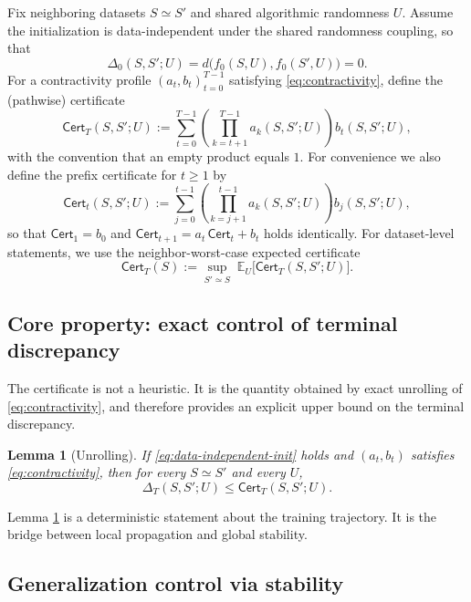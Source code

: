 \documentclass{article}
\newtheorem{lemma}[theorem]{Lemma}
\numberwithin{equation}{section}
\begin{document}
Fix neighboring datasets $S\simeq S'$ and shared algorithmic randomness $U$.
Assume the initialization is data-independent under the shared randomness coupling, so that
\begin{equation}
	\label{eq:data-independent-init}
	\Delta_0(S,S';U)=d\!\big(f_0(S,U),f_0(S',U)\big)=0.
\end{equation}
For a contractivity profile $(a_t,b_t)_{t=0}^{T-1}$ satisfying \eqref{eq:contractivity}, define the (pathwise) certificate
\begin{equation}
	\label{eq:certificate-pathwise}
	\mathsf{Cert}_T(S,S';U)
	:=
	\sum_{t=0}^{T-1}
	\left(\prod_{k=t+1}^{T-1} a_k(S,S';U)\right)
	b_t(S,S';U),
\end{equation}
with the convention that an empty product equals $1$. For convenience we also define the prefix certificate for $t\ge 1$ by
\[
\mathsf{Cert}_t(S,S';U)
:=
\sum_{j=0}^{t-1}
\left(\prod_{k=j+1}^{t-1} a_k(S,S';U)\right)b_j(S,S';U),
\]
so that $\mathsf{Cert}_1=b_0$ and $\mathsf{Cert}_{t+1}=a_t\,\mathsf{Cert}_t+b_t$ holds identically. For dataset-level statements, we use the neighbor-worst-case expected certificate
\begin{equation}
	\label{eq:certificate-dataset}
	\mathsf{Cert}_T(S)
	:=
	\sup_{S'\simeq S}\;
	\mathbb{E}_U\big[\mathsf{Cert}_T(S,S';U)\big].
\end{equation}

\subsection{Core property: exact control of terminal discrepancy}
\label{subsec:certificate-discrepancy}

The certificate is not a heuristic. It is the quantity obtained by exact unrolling of \eqref{eq:contractivity}, and therefore provides an explicit upper bound on the terminal discrepancy.

\begin{lemma}[Unrolling]
	\label{lem:unrolling}
	If \eqref{eq:data-independent-init} holds and $(a_t,b_t)$ satisfies \eqref{eq:contractivity}, then for every $S\simeq S'$ and every $U$,
	\[
	\Delta_T(S,S';U)\le \mathsf{Cert}_T(S,S';U).
	\]
\end{lemma}

\noindent
Lemma \ref{lem:unrolling} is a deterministic statement about the training trajectory. It is the bridge between local propagation and global stability.

\subsection{Generalization control via stability}
\label{subsec:certificate-generalization}
\end{document}
